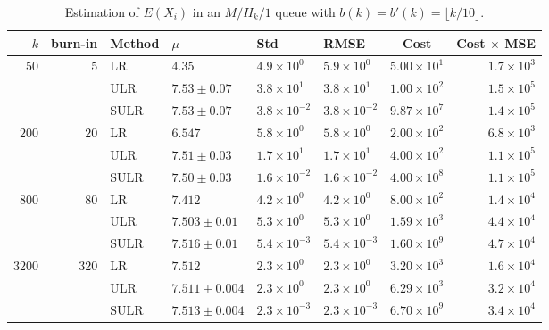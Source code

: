 \documentclass[a4paper,11pt]{article}
\begin{document}
\begin{table}
\caption{Estimation of \(E(X_{i})\) in an \(M/H_{k}/1\) queue with  \(b(k)=b'(k)=\lfloor k/10\rfloor\).}
\begin{small}
\begin{tabular}{rrllllcr}\hline
$k$ &  burn-in & Method  & $\mu$  & Std & RMSE & Cost& Cost $\times$ MSE \\ \hline
$50$&$5 $&LR & $4.35$ & $4.9\times10^0$ & $5.9\times10^0$ & $5.00\times10^1$ & $1.7\times10^3$\\
& &ULR & $7.53 \pm 0.07$ & $3.8\times10^1$ & $3.8\times10^1$ & $1.00\times10^2$ & $1.5\times10^5$\\
& &SULR & $7.53 \pm 0.07$ & $3.8\times10^{-2}$ & $3.8\times10^{-2}$ & $9.87\times10^7$ & $1.4\times10^5$\\
$200$&$20 $&LR & $6.547$ & $5.8\times10^0$ & $5.8\times10^0$ & $2.00\times10^2$ & $6.8\times10^3$\\
& &ULR & $7.51 \pm 0.03$ & $1.7\times10^1$ & $1.7\times10^1$ & $4.00\times10^2$ & $1.1\times10^5$\\
& &SULR & $7.50 \pm 0.03$ & $1.6\times10^{-2}$ & $1.6\times10^{-2}$ & $4.00\times10^8$ & $1.1\times10^5$\\
$800$&$80 $&LR & $7.412$ & $4.2\times10^0$ & $4.2\times10^0$ & $8.00\times10^2$ & $1.4\times10^4$\\
& &ULR & $7.503 \pm 0.01$ & $5.3\times10^0$ & $5.3\times10^0$ & $1.59\times10^3$ & $4.4\times10^4$\\
& &SULR & $7.516 \pm 0.01$ & $5.4\times10^{-3}$ & $5.4\times10^{-3}$ & $1.60\times10^9$ & $4.7\times10^4$\\
$3200$&$320 $&LR & $7.512$ & $2.3\times10^0$ & $2.3\times10^0$ & $3.20\times10^3$ & $1.6\times10^4$\\
& &ULR & $7.511 \pm 0.004$ & $2.3\times10^0$ & $2.3\times10^0$ & $6.29\times10^3$ & $3.2\times10^4$\\
& &SULR & $7.513 \pm 0.004$ & $2.3\times10^{-3}$ & $2.3\times10^{-3}$ & $6.70\times10^9$ & $3.4\times10^4$\\
\hline\end{tabular}
 \end{small}
\label{tab:MH0.1}
\end{table}
\end{document}
